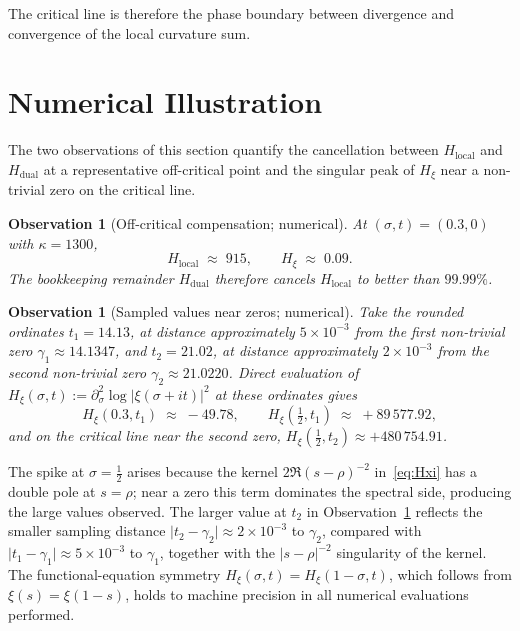 \documentclass[11pt]{article}
\newtheorem{observation}[theorem]{Observation}
\newcommand{\Hxi}{H_{\xi}}
\newcommand{\Hlocal}{H_{\mathrm{local}}}
\newcommand{\Hdual}{H_{\mathrm{dual}}}
\begin{document}
\medskip
The critical line is therefore the phase boundary between
divergence and convergence of the local curvature sum.

\section{Numerical Illustration}
\label{sec:numerical}

The two observations of this section quantify the
cancellation between $\Hlocal$ and $\Hdual$ at a
representative off-critical point and the singular peak of
$\Hxi$ near a non-trivial zero on the critical line.

\begin{observation}[Off-critical compensation; numerical]
\label{obs:cancellation}
At $(\sigma,t)=(0.3,0)$ with $\kappa=1300$,
\[
\Hlocal\;\approx\;915,
\qquad
\Hxi\;\approx\;0.09.
\]
The bookkeeping remainder $\Hdual$ therefore cancels $\Hlocal$
to better than $99.99\%$.
\end{observation}

\begin{observation}[Sampled values near zeros; numerical]
\label{obs:peak}
Take the rounded ordinates $t_1=14.13$, at distance
approximately $5\times 10^{-3}$ from the first non-trivial
zero $\gamma_1\approx 14.1347$, and $t_2=21.02$, at distance
approximately $2\times 10^{-3}$ from the second non-trivial
zero $\gamma_2\approx 21.0220$.
Direct evaluation of
$\Hxi(\sigma,t):=\partial_\sigma^{2}\log\lvert\xi(\sigma+it)\rvert^{2}$
at these ordinates gives
\[
\Hxi(0.3,t_1)\;\approx\;-49.78,
\qquad
\Hxi(\tfrac12,t_1)\;\approx\;+89\,577.92,
\]
and on the critical line near the second zero,
$\Hxi(\tfrac12,t_2)\approx +480\,754.91$.
\end{observation}

The spike at $\sigma=\tfrac12$ arises because the kernel
$2\Re(s-\rho)^{-2}$ in~\eqref{eq:Hxi} has a double pole at
$s=\rho$; near a zero this term dominates the spectral side,
producing the large values observed.
The larger value at $t_2$ in
Observation~\ref{obs:peak} reflects the smaller sampling
distance $\lvert t_2-\gamma_2\rvert\approx 2\times 10^{-3}$
to $\gamma_2$, compared with
$\lvert t_1-\gamma_1\rvert\approx 5\times 10^{-3}$ to
$\gamma_1$, together with the $\lvert s-\rho\rvert^{-2}$
singularity of the kernel.
The functional-equation symmetry
$\Hxi(\sigma,t)=\Hxi(1-\sigma,t)$, which follows from
$\xi(s)=\xi(1-s)$, holds to machine precision in all numerical
evaluations performed.
\end{document}
